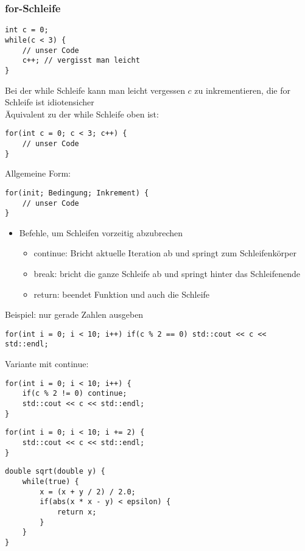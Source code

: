 \documentclass[a4paper]{scrartcl}
\theoremstyle{definition}
\theoremstyle{plain}
\theoremstyle{remark}
\theoremstyle{remark}
\begin{document}
\subsubsection{for-Schleife}
\label{sec-7-2-6}
\begin{verbatim}
int c = 0;
while(c < 3) {
	// unser Code
	c++; // vergisst man leicht
}
\end{verbatim}

Bei der while Schleife kann man leicht vergessen $c$ zu inkrementieren, die for Schleife ist idiotensicher \\
        Äquivalent zu der while Schleife oben ist:
\begin{verbatim}
for(int c = 0; c < 3; c++) {
	// unser Code
}
\end{verbatim}

Allgemeine Form:
\begin{verbatim}
for(init; Bedingung; Inkrement) {
	// unser Code
}
\end{verbatim}
\begin{itemize}
\item Befehle, um Schleifen vorzeitig abzubrechen
\begin{itemize}
\item continue: Bricht aktuelle Iteration ab und springt zum Schleifenkörper
\item break: bricht die ganze Schleife ab und springt hinter das Schleifenende
\item return: beendet Funktion und auch die Schleife
\end{itemize}
\end{itemize}
Beispiel: nur gerade Zahlen ausgeben
\begin{verbatim}
for(int i = 0; i < 10; i++) if(c % 2 == 0) std::cout << c << std::endl;
\end{verbatim}
Variante mit continue:
\begin{verbatim}
for(int i = 0; i < 10; i++) {
	if(c % 2 != 0) continue;
	std::cout << c << std::endl;
}
\end{verbatim}

\begin{verbatim}
for(int i = 0; i < 10; i += 2) {
	std::cout << c << std::endl;
}
\end{verbatim}
\begin{verbatim}
double sqrt(double y) {
	while(true) {
		x = (x + y / 2) / 2.0;
		if(abs(x * x - y) < epsilon) {
			return x;
		}
	}
}
\end{verbatim}
\end{document}
